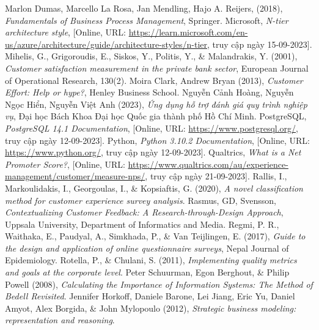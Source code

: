 \begin{thebibliography}{9}
     Marlon Dumas, Marcello La Rosa, Jan Mendling, Hajo A. Reijers, (2018), \textit{Fundamentals of Business Process Management}, Springer.
     Microsoft, \textit{N-tier architecture style}, [Online, URL: \url{https://learn.microsoft.com/en-us/azure/architecture/guide/architecture-styles/n-tier}, truy cập ngày 15-09-2023].
     Mihelis, G., Grigoroudis, E., Siskos, Y., Politis, Y., \& Malandrakis, Y. (2001), \textit{Customer satisfaction measurement in the private bank sector}, European Journal of Operational Research, 130(2).
     Moira Clark, Andrew Bryan (2013), \textit{Customer Effort: Help or hype?}, Henley Business School.
     Nguyễn Cảnh Hoàng, Nguyễn Ngọc Hiển, Nguyễn Việt Anh (2023), \textit{Ứng dụng hỗ trợ đánh giá quy trình nghiệp vụ}, Đại học Bách Khoa Đại học Quốc gia thành phố Hồ Chí Minh.
     PostgreSQL, \textit{PostgreSQL 14.1 Documentation}, [Online, URL: \url{https://www.postgresql.org/}, truy cập ngày 12-09-2023].
     Python, \textit{Python 3.10.2 Documentation}, [Online, URL: \url{https://www.python.org/}, truy cập ngày 12-09-2023].
     Qualtrics, \textit{What is a Net Promoter Score?}, [Online, URL: \url{https://www.qualtrics.com/au/experience-management/customer/measure-nps/}, truy cập ngày 21-09-2023].
     Rallis, I., Markoulidakis, I., Georgoulas, I., \& Kopsiaftis, G. (2020), \textit{A novel classification method for customer experience survey analysis}.
     Rasmus, GD, Svensson, \textit{Contextualizing Customer Feedback: A Research-through-Design Approach}, Uppsala University, Department of Informatics and Media.
     Regmi, P. R., Waithaka, E., Paudyal, A., Simkhada, P., \& Van Teijlingen, E. (2017), \textit{Guide to the design and application of online questionnaire surveys}, Nepal Journal of Epidemiology.
     Rotella, P., \& Chulani, S. (2011), \textit{Implementing quality metrics and goals at the corporate level}.
     Peter Schuurman, Egon Berghout, \& Philip Powell (2008), \textit{Calculating the Importance of Information Systems: The Method of Bedell Revisited}.
     Jennifer Horkoff, Daniele Barone, Lei Jiang,
    Eric Yu, Daniel Amyot, Alex Borgida, \& John Mylopoulo (2012), \textit{Strategic business modeling: representation and reasoning}.
\end{thebibliography}